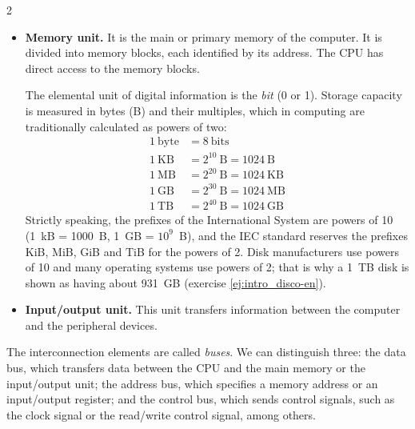 \begin{paracol}{2}
\begin{itemize}
\item \textbf{Memory unit.} It is the main or primary memory of the computer. It is divided into memory blocks, each identified by its address. The CPU has direct access to the memory blocks.

The elemental unit of digital information is the \emph{bit}  (0 or 1). Storage capacity is measured in bytes  (B) and their multiples, which in computing are traditionally calculated as powers of two:
\begin{align*}
1\ \text{byte} &= 8\ \text{bits}\\
1\ \text{KB} &= 2^{10}\ \text{B} = 1024\ \text{B}\\
1\ \text{MB} &= 2^{20}\ \text{B} = 1024\ \text{KB}\\
1\ \text{GB} &= 2^{30}\ \text{B} = 1024\ \text{MB}\\
1\ \text{TB} &= 2^{40}\ \text{B} = 1024\ \text{GB}
\end{align*}
Strictly speaking, the prefixes of the International System are powers of 10 (1~kB = 1000~B, 1~GB = $10^9$~B), and the IEC standard reserves the prefixes KiB, MiB, GiB and TiB for the powers of 2. Disk manufacturers use powers of 10 and many operating systems use powers of 2; that is why a 1~TB disk is shown as having about 931~GB (exercise \ref{ej:intro_disco-en}).

\item \textbf{Input/output unit.} This unit transfers information between the computer and the peripheral devices.
\end{itemize}

The interconnection elements are called \emph{buses}. We can distinguish three: the data bus, which transfers data between the CPU and the main memory or the input/output unit; the address bus, which specifies a memory address or an input/output register; and the control bus, which sends control signals, such as the clock signal or the read/write control signal, among others.
\end{paracol}


